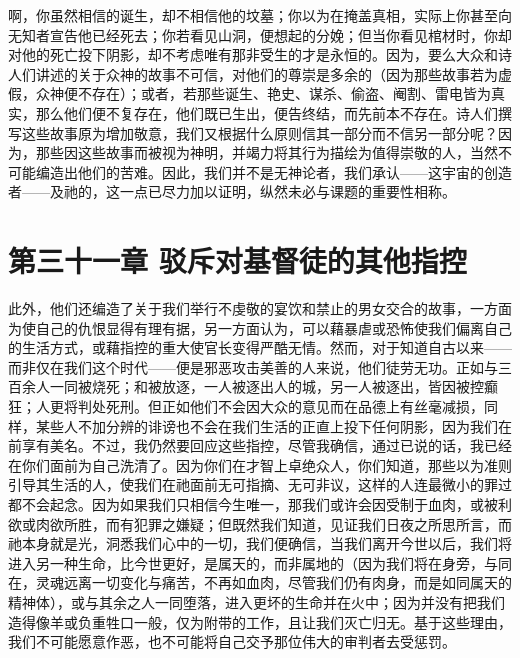 啊，你虽然相信的诞生，却不相信他的坟墓；你以为在掩盖真相，实际上你甚至向无知者宣告他已经死去；你若看见山洞，便想起的分娩；但当你看见棺材时，你却对他的死亡投下阴影，却不考虑唯有那非受生的才是永恒的。因为，要么大众和诗人们讲述的关于众神的故事不可信，对他们的尊崇是多余的（因为那些故事若为虚假，众神便不存在）；或者，若那些诞生、艳史、谋杀、偷盗、阉割、雷电皆为真实，那么他们便不复存在，他们既已生出，便告终结，而先前本不存在。诗人们撰写这些故事原为增加敬意，我们又根据什么原则信其一部分而不信另一部分呢？因为，那些因这些故事而被视为神明，并竭力将其行为描绘为值得崇敬的人，当然不可能编造出他们的苦难。因此，我们并不是无神论者，我们承认——这宇宙的创造者——及祂的，这一点已尽力加以证明，纵然未必与课题的重要性相称。\par


\section{第三十一章 驳斥对基督徒的其他指控}

此外，他们还编造了关于我们举行不虔敬的宴饮和禁止的男女交合的故事，一方面为使自己的仇恨显得有理有据，另一方面认为，可以藉暴虐或恐怖使我们偏离自己的生活方式，或藉指控的重大使官长变得严酷无情。然而，对于知道自古以来——而非仅在我们这个时代——便是邪恶攻击美善的人来说，他们徒劳无功。正如与三百余人一同被烧死；和被放逐，一人被逐出人的城，另一人被逐出，皆因被控癫狂；人更将判处死刑。但正如他们不会因大众的意见而在品德上有丝毫减损，同样，某些人不加分辨的诽谤也不会在我们生活的正直上投下任何阴影，因为我们在前享有美名。不过，我仍然要回应这些指控，尽管我确信，通过已说的话，我已经在你们面前为自己洗清了。因为你们在才智上卓绝众人，你们知道，那些以为准则引导其生活的人，使我们在祂面前无可指摘、无可非议，这样的人连最微小的罪过都不会起念。因为如果我们只相信今生唯一，那我们或许会因受制于血肉，或被利欲或肉欲所胜，而有犯罪之嫌疑；但既然我们知道，见证我们日夜之所思所言，而祂本身就是光，洞悉我们心中的一切，我们便确信，当我们离开今世以后，我们将进入另一种生命，比今世更好，是属天的，而非属地的（因为我们将在身旁，与同在，灵魂远离一切变化与痛苦，不再如血肉，尽管我们仍有肉身，而是如同属天的精神体），或与其余之人一同堕落，进入更坏的生命并在火中；因为并没有把我们造得像羊或负重牲口一般，仅为附带的工作，且让我们灭亡归无。基于这些理由，我们不可能愿意作恶，也不可能将自己交予那位伟大的审判者去受惩罚。\par

